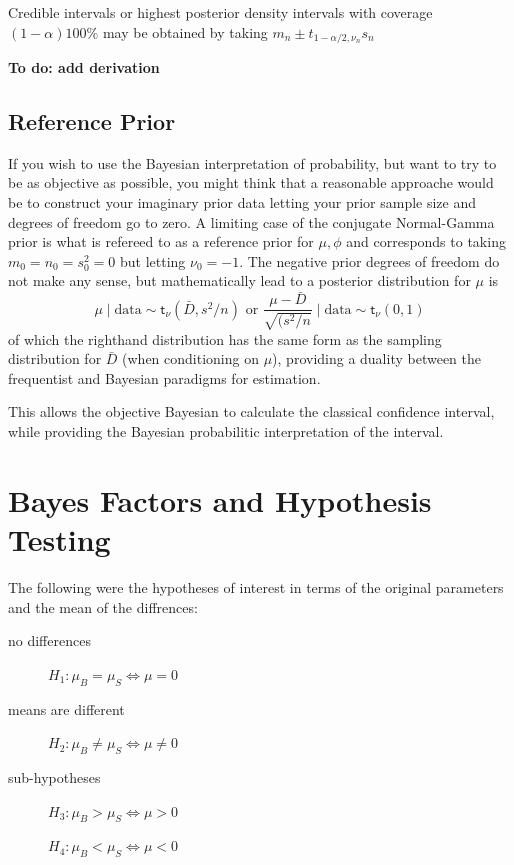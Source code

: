 \documentclass[11pt]{article}
\newcommand{\St}{\textsf{t}}
\def\data{\text{data}}
\begin{document}
Credible intervals or highest posterior density intervals with coverage $(1 - \alpha) 100\%$ may be obtained by taking 
$m_n \pm t_{1 - \alpha/2, \nu_n} s_n$

{\bf To do: add derivation}

\subsection{Reference Prior}

If you wish to use the Bayesian interpretation of probability, but want to try to be as objective as possible, you might think that a reasonable approache would be to construct your imaginary prior data letting your prior sample size and degrees of freedom go to zero.  A limiting case of the conjugate Normal-Gamma prior is what is refereed to as a reference prior for $\mu, \phi$ and corresponds to taking $m_0 = n_0 = s^2_0 = 0$ but letting $\nu_0 = -1$.  The negative prior degrees of freedom do not make any sense, but mathematically lead to 
a posterior distribution for $\mu$ is 
$$
\mu \mid \data  \sim \St_{\nu}(\bar{D}, s^2/n)  \text{ or }  \frac{\mu - \bar{D}}{\sqrt{(s^2/n}}  \mid \data \sim \St_{\nu}(0,1)
$$
of which the righthand distribution has the same form as the sampling distribution  for $\bar{D}$ (when conditioning on $\mu$), providing a duality between the frequentist and Bayesian paradigms for estimation.

This allows the objective Bayesian to calculate the classical confidence interval, while providing the Bayesian probabilitic interpretation of the interval.

\section*{Bayes Factors and Hypothesis Testing}

The following were the hypotheses of interest in terms of the original parameters and the mean of the diffrences:
\begin{description}%
\item [no differences] $H_1:  \mu_B = \mu_S  \Leftrightarrow \mu = 0 $   
\item [means are different] $H_2:  \mu_B \neq \mu_S \Leftrightarrow \mu  \neq 0 $ 
\item [sub-hypotheses]  $H_{3}:  \mu_B > \mu_S \Leftrightarrow \mu  > 0 $ 
\item [ ] $H_{4}:  \mu_B < \mu_S \Leftrightarrow \mu  < 0 $
\end{description}
\end{document}
